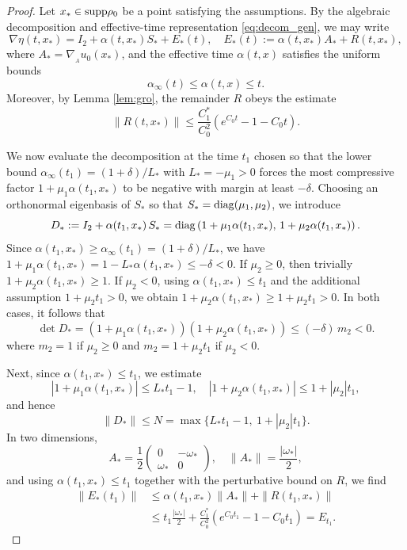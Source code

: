\documentclass[11pt]{amsart}
\numberwithin{equation}{section}
\theoremstyle{definition}
\theoremstyle{remark}
\numberwithin{equation}{section}
\newcommand{\bq}{\begin{equation}}
\newcommand{\eq}{\end{equation}}
\newcommand{\lt}{\left}
\newcommand{\rt}{\right}
\newcommand{\supp}{{\rm supp}}
\newcommand{\diag}{{\rm diag}}
\newcommand{\nabA}{\nabla_{\!\!{}_A}}
\renewcommand{\ge}{\geqslant}
\renewcommand{\le}{\leqslant}
\begin{document}
\begin{proof}
 Let $x_*\in\supp\rho_0$ be a point satisfying the assumptions. By the algebraic decomposition and effective-time representation \eqref{eq:decom_gen}, we may write
\[
\nabla\eta(t,x_*) = I_2 + \alpha(t,x_*) S_* +  E_*(t), \quad   E_*(t):= \alpha(t,x_*) A_*+  R(t,x_*),
\]
where $A_* = \nabA u_0(x_*)$, and the effective time $\alpha(t,x)$ satisfies the uniform bounds
\[
\alpha_\infty(t)\le \alpha(t,x)\le t.
\]
Moreover, by Lemma \ref{lem:gro}, the remainder $R$ obeys the estimate
\[
\|R(t,x_*)\| \le \frac{C_1^*}{C_0^2}\lt(e^{C_0 t}-1-C_0 t\rt).
\]

We now evaluate the decomposition at the time $t_1$ chosen so that the lower bound $\alpha_\infty(t_1)=(1+\delta)/L_*$ with $L_*=-\mu_1>0$ forces the most compressive factor $1+\mu_1\alpha(t_1,x_*)$ to be negative with margin at least $-\delta$. Choosing an orthonormal eigenbasis of $S_*$ so that $S_*=\diag(\mu_1,\mu_2)$, we introduce
\[
D_*:=I_2+\alpha(t_1,x_*)\,S_* =\diag\lt(1+\mu_1\alpha(t_1,x_*),\,1+\mu_2\alpha(t_1,x_*)\rt).
\]
Since $\alpha(t_1,x_*)\ge\alpha_\infty(t_1)=(1+\delta)/L_*$, we have $1+\mu_1\alpha(t_1,x_*)=1-L_*\alpha(t_1,x_*)\le-\delta<0$. If $\mu_2\ge0$, then trivially $1+\mu_2\alpha(t_1,x_*)\ge1$. If $\mu_2<0$, using $\alpha(t_1,x_*)\le t_1$ and the additional assumption $1+\mu_2 t_1>0$, we obtain $1+\mu_2\alpha(t_1,x_*)\ge 1+\mu_2 t_1>0$. In both cases, it follows that
\bq\label{eq:detD_upper}
\det D_* =\lt(1+\mu_1\alpha(t_1,x_*)\rt)\lt(1+\mu_2\alpha(t_1,x_*)\rt) \le (-\delta)\,m_2<0.
\eq
where $m_2=1$ if $\mu_2\ge0$ and $m_2=1+\mu_2 t_1$ if $\mu_2<0$.

Next, since $\alpha(t_1,x_*)\le t_1$, we estimate
\[
|1+\mu_1\alpha(t_1,x_*)|\le L_*t_1-1, \quad |1+\mu_2\alpha(t_1,x_*)|\le 1+|\mu_2|t_1,
\]
and hence
\bq\label{eq:D_norm_bound}
\|D_*\|\le N=\max\{L_*t_1-1,\ 1+|\mu_2|t_1\}.
\eq
In two dimensions,
\[
A_*=\frac12
\begin{pmatrix}
0&-\omega_*\\
\omega_*&0
\end{pmatrix},
\quad
\|A_*\|=\frac{|\omega_*|}{2},
\]
and using $\alpha(t_1,x_*)\le t_1$ together with the perturbative bound on $R$, we find
\bq\label{eq:E_bound}
\begin{split}
\|E_*(t_1)\|
&\le \alpha(t_1,x_*)\|A_*\|+\|R(t_1,x_*)\| \\
&\le t_1\frac{|\omega_*|}{2}+\frac{C_1^*}{C_0^2}\lt(e^{C_0t_1}-1-C_0t_1\rt)
=E_{t_1}.
\end{split}
\eq


\end{proof}
\end{document}
